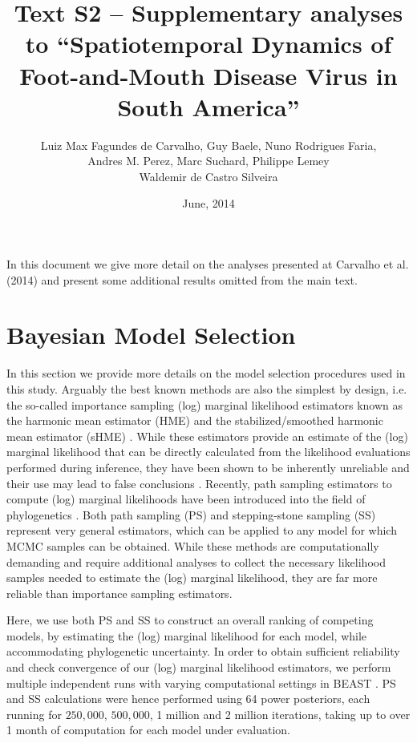 \documentclass[a4paper,10pt]{article}
\title{Text S2 -- Supplementary analyses to ``Spatiotemporal Dynamics of Foot-and-Mouth Disease Virus in South America''} %
\author{
Luiz Max Fagundes de Carvalho, Guy Baele, Nuno Rodrigues Faria,\\
Andres M. Perez, Marc Suchard,  Philippe Lemey\\
Waldemir de Castro Silveira
}
\date{June, 2014}
\begin{document}
\maketitle

In this document we give more detail on the analyses presented at Carvalho et al. (2014) and present some additional results omitted  from the main text.

\section{Bayesian Model Selection}

In this section we provide more details on the model selection procedures used in this study.
Arguably the best known methods are also the simplest by design, i.e. the so-called importance sampling (log) marginal likelihood estimators known as the harmonic mean estimator (HME) \cite{Newton} and the stabilized/smoothed harmonic mean estimator (sHME) \cite{M-suchard2005models}.
While these estimators provide an estimate of the (log) marginal likelihood that can be directly calculated from the likelihood evaluations performed during inference, they have been shown to be inherently unreliable and their use may lead to false conclusions \cite{M-LartillotPhilippe, M-Xie, M-Baele2012, M-Baele2013a,M-Baele2013b}.
Recently, path sampling estimators to compute (log) marginal likelihoods have been introduced into the field of phylogenetics \cite{M-LartillotPhilippe, M-Xie}.
Both path sampling (PS) and stepping-stone sampling (SS) represent very general estimators, which can be applied to any model for which MCMC samples can be obtained.
While these methods are computationally demanding and require additional analyses to collect the necessary likelihood samples needed to estimate the (log) marginal likelihood, they are far more reliable than importance sampling estimators.

Here, we use both PS and SS to construct an overall ranking of competing models, by estimating the (log) marginal likelihood for each model, while accommodating phylogenetic uncertainty.
In order to obtain sufficient reliability and check convergence of our (log) marginal likelihood estimators, we perform multiple independent runs with varying computational settings in BEAST \cite{M-beast2012}.
PS and SS calculations were hence performed using 64 power posteriors, each running for $250,000$, $500,000$, 1 million and 2 million iterations, taking up to over 1 month of computation for each model under evaluation.
\end{document}
